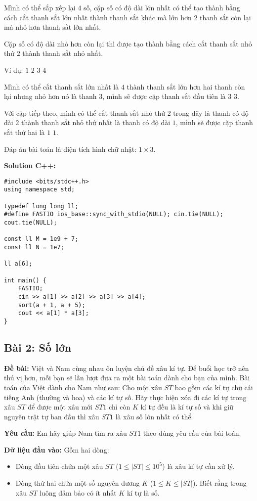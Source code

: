 \documentclass[12pt]{scrartcl}  %
\begin{document}
Mình có thể sắp xếp lại $4$ số, cặp số có độ dài lớn nhất có thể
tạo thành bằng cách cắt thanh sắt lớn nhất thành thanh sắt khác
mà lớn hơn $2$ thanh sắt còn lại mà nhỏ hơn thanh sắt lớn nhất.

Cặp số có độ dài nhỏ hơn còn lại thì được tạo thành bằng cách cắt
thanh sắt nhỏ thứ $2$ thành thanh sắt nhỏ nhất.

Ví dụ: $1$ $2$ $3$ $4$

Mình có thể cắt thanh sắt lớn nhất là $4$ thành thanh sắt lớn
hơn hai thanh còn lại nhưng nhỏ hơn nó là thanh $3$, mình
sẽ được cặp thanh sắt đầu tiên là $3$ $3$.

Với cặp tiếp theo, mình có thể cắt thanh sắt nhỏ thứ $2$ trong dãy
là thanh có độ dài $2$ thành
thanh sắt nhỏ thứ nhất là thanh có độ dài $1$, mình sẽ được
cặp thanh sắt thứ hai là $1$ $1$.

Đáp án bài toán là diện tích hình chữ nhật: $1 \times 3$.

\textbf{Solution C++:}
\begin{lstlisting}
#include <bits/stdc++.h>
using namespace std;

typedef long long ll;
#define FASTIO ios_base::sync_with_stdio(NULL); cin.tie(NULL); cout.tie(NULL);

const ll M = 1e9 + 7;
const ll N = 1e7;

ll a[6];

int main() {
    FASTIO;
    cin >> a[1] >> a[2] >> a[3] >> a[4];
    sort(a + 1, a + 5);
    cout << a[1] * a[3];
}

\end{lstlisting}

\subsection{Bài 2: Số lớn}
\textbf{Đề bài:}
Việt và Nam cùng nhau ôn luyện chủ đề xâu kí tự. Để buổi học trở nên thú vị hơn, mỗi bạn sẽ lần lượt đưa ra một bài toán 
dành cho bạn của mình. Bài toán của Việt dành cho Nam như sau: Cho một xâu $ST$ bao gồm các kí tự chữ cái tiếng Anh (thường và hoa) và 
các kí tự số. Hãy thực hiện xóa đi các kí tự trong xâu $ST$ để được một xâu mới $ST1$ chỉ còn $K$ kí tự đều là kí tự số và khi giữ nguyên trật tự ban đầu 
thì xâu $ST1$ là xâu số lớn nhất có thể.

\textbf{Yêu cầu:}
Em hãy giúp Nam tìm ra xâu $ST1$ theo đúng yêu cầu của bài toán.

\textbf{Dữ liệu đầu vào:}
Gồm hai dòng:
\begin{itemize}
    \item Dòng đầu tiên chứa một xâu $ST$ ($1 \leq |ST| \leq 10^5$) là xâu kí tự cần xử lý.
    \item Dòng thứ hai chứa một số nguyên dương $K$ ($1 \leq K \leq |ST|$). Biết rằng trong xâu $ST$ luông đảm bảo có ít nhất $K$ kí tự là số. 
\end{itemize}
\end{document}
